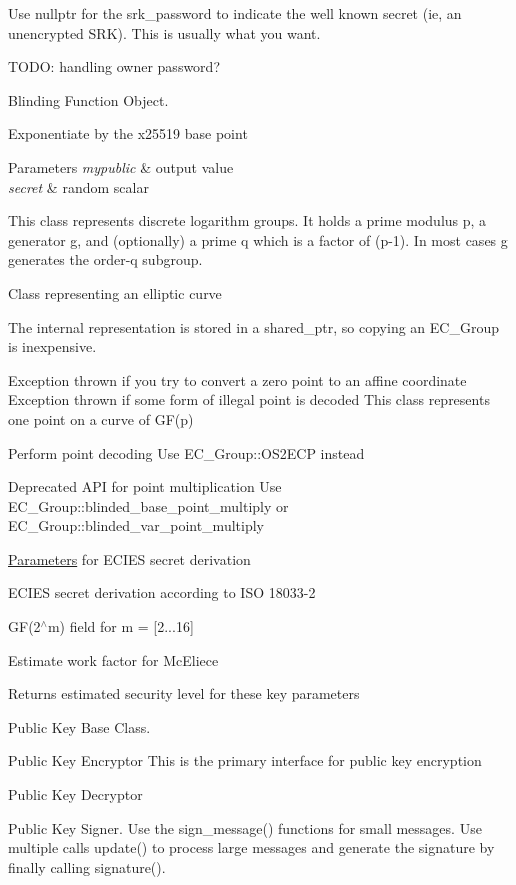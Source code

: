Use nullptr for the srk\+\_\+password to indicate the well known secret (ie, an unencrypted S\+RK). This is usually what you want.

T\+O\+DO\+: handling owner password?

Blinding Function Object.

Exponentiate by the x25519 base point 
\begin{DoxyParams}{Parameters}
{\em mypublic} & output value \\
\hline
{\em secret} & random scalar\\
\hline
\end{DoxyParams}
This class represents discrete logarithm groups. It holds a prime modulus p, a generator g, and (optionally) a prime q which is a factor of (p-\/1). In most cases g generates the order-\/q subgroup.

Class representing an elliptic curve

The internal representation is stored in a shared\+\_\+ptr, so copying an E\+C\+\_\+\+Group is inexpensive.

Exception thrown if you try to convert a zero point to an affine coordinate Exception thrown if some form of illegal point is decoded This class represents one point on a curve of G\+F(p)

Perform point decoding Use E\+C\+\_\+\+Group\+::\+O\+S2\+E\+CP instead

Deprecated A\+PI for point multiplication Use E\+C\+\_\+\+Group\+::blinded\+\_\+base\+\_\+point\+\_\+multiply or E\+C\+\_\+\+Group\+::blinded\+\_\+var\+\_\+point\+\_\+multiply

\mbox{\hyperlink{struct_parameters}{Parameters}} for E\+C\+I\+ES secret derivation

E\+C\+I\+ES secret derivation according to I\+SO 18033-\/2

G\+F(2$^\wedge$m) field for m = \mbox{[}2...16\mbox{]}

Estimate work factor for Mc\+Eliece \begin{DoxyReturn}{Returns}
estimated security level for these key parameters
\end{DoxyReturn}
Public Key Base Class.

Public Key Encryptor This is the primary interface for public key encryption

Public Key Decryptor

Public Key Signer. Use the sign\+\_\+message() functions for small messages. Use multiple calls update() to process large messages and generate the signature by finally calling signature().

